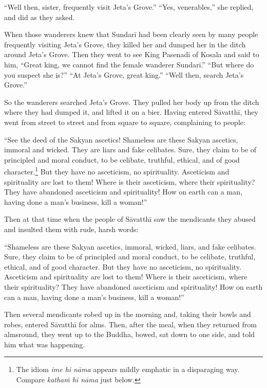 \documentclass[12pt,openany]{book}%
\begin{document}
“Well then, sister, frequently visit Jeta’s Grove.” “Yes, venerables,” she replied, and did as they asked. 

When those wanderers knew that \textsanskrit{Sundarī} had been clearly seen by many people frequently visiting Jeta’s Grove, they killed her and dumped her in the ditch around Jeta’s Grove. Then they went to see King Pasenadi of Kosala and said to him, “Great king, we cannot find the female wanderer \textsanskrit{Sundarī}.” “But where do you suspect she is?” “At Jeta’s Grove, great king.” “Well then, search Jeta’s Grove.” 

So the wanderers searched Jeta’s Grove. They pulled her body up from the ditch where they had dumped it, and lifted it on a bier. Having entered \textsanskrit{Sāvatthī}, they went from street to street and from square to square, complaining to people: 

“See the deed of the Sakyan ascetics! Shameless are these Sakyan ascetics, immoral and wicked. They are liars and fake celibates. Sure, they claim to be of principled and moral conduct, to be celibate, truthful, ethical, and of good character.\footnote{The idiom \textit{ime hi \textsanskrit{nāma}} appears mildly emphatic in a disparaging way. Compare \textit{\textsanskrit{kathaṁ} hi \textsanskrit{nāma}} just below. } But they have no asceticism, no spirituality. Asceticism and spirituality are lost to them! Where is their asceticism, where their spirituality? They have abandoned asceticism and spirituality! How on earth can a man, having done a man’s business, kill a woman!” 

Then at that time when the people of \textsanskrit{Sāvatthī} saw the mendicants they abused and insulted them with rude, harsh words: 

“Shameless are these Sakyan ascetics, immoral, wicked, liars, and fake celibates. Sure, they claim to be of principled and moral conduct, to be celibate, truthful, ethical, and of good character. But they have no asceticism, no spirituality. Asceticism and spirituality are lost to them! Where is their asceticism, where their spirituality? They have abandoned asceticism and spirituality! How on earth can a man, having done a man’s business, kill a woman!” 

Then several mendicants robed up in the morning and, taking their bowls and robes, entered \textsanskrit{Sāvatthī} for alms. Then, after the meal, when they returned from almsround, they went up to the Buddha, bowed, sat down to one side, and told him what was happening. 
\end{document}
